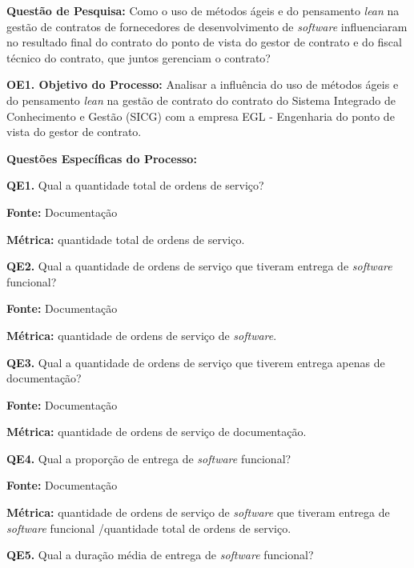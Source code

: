 \textbf{Questão de Pesquisa:} Como o uso de métodos ágeis e do pensamento \textit{lean} na gestão de contratos de fornecedores de desenvolvimento de \textit{software} influenciaram no resultado final do contrato do ponto de vista do gestor de contrato e do fiscal técnico do contrato, que juntos gerenciam o contrato?


\textbf{OE1. Objetivo do Processo:} Analisar a influência do uso de métodos ágeis e do pensamento \textit{lean} na gestão de contrato do contrato do Sistema Integrado de Conhecimento e Gestão (SICG) com a empresa EGL - Engenharia do ponto de vista do gestor de contrato.

\textbf{Questões Específicas do Processo:}


\textbf{QE1.}  Qual a quantidade total de ordens de serviço?

\textbf{Fonte:} Documentação

\textbf{Métrica:} quantidade total de ordens de serviço.
 
\vspace{\onelineskip} 

\textbf{QE2.} Qual a quantidade de ordens de serviço que tiveram entrega de \textit{software} funcional?

\textbf{Fonte:} Documentação

\textbf{Métrica:} quantidade de ordens de serviço de \textit{software}.
 
 \vspace{\onelineskip} 

\textbf{QE3.} Qual a quantidade de ordens de serviço que tiverem entrega apenas de documentação?

\textbf{Fonte:} Documentação

\textbf{Métrica:} quantidade de ordens de serviço de documentação.

 \vspace{\onelineskip} 
 
\textbf{QE4.} Qual a proporção de entrega de \textit{software} funcional?

\textbf{Fonte:} Documentação

\textbf{Métrica:} quantidade de ordens de serviço de \textit{software} que tiveram entrega de \textit{software} funcional /quantidade total de ordens de serviço.

 \vspace{\onelineskip} 

\textbf{QE5.} Qual a duração média de entrega de \textit{software} funcional?

